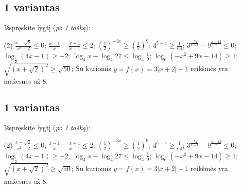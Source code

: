 \documentclass[a4paper]{article}
\begin{document}
\subsection*{1 variantas}

Išspręskite lygtį (\textit{po 1 tašką}):
\begin{tasks}[item-format={\normalfont}, after-item-skip=2mm](2)
      \task $\frac{x-\sqrt{2}}{x^2-2}\leqslant 0$;
      \task $\frac{x-1}{x}-\frac{x+1}{x-1} \leqslant 2$;
      \task $(\frac{1}{2})^{-3x} \geqslant (\frac{1}{2})^9$;
      \task $4^{5-x} \geqslant \frac{1}{64}$;
      \task $3^{\frac{-5x}{x-1}}-9^{\frac{x-12}{2}} \leqslant 0$;
      \task $\log_{\frac{1}{2}}(4x-1) \geq -2$;
      \task $\log_{4}x-\log_{4}27 \leqslant \log_{4}\frac{1}{9}$;
      \task $\log_{6}(-x^2+9x-14) \geq 1$;
      \task $\sqrt{(x+\sqrt{2})^2} \geqslant \sqrt{50}$;
      \task Su kuriomis $y=f(x)=3|x+2|-1$ reikšmės yra mažesnės už 8;
\end{tasks}

\subsection*{1 variantas}

Išspręskite lygtį (\textit{po 1 tašką}):
\begin{tasks}[item-format={\normalfont}, after-item-skip=2mm](2)
      \task $\frac{x-\sqrt{2}}{x^2-2}\leqslant 0$;
      \task $\frac{x-1}{x}-\frac{x+1}{x-1} \leqslant 2$;
      \task $(\frac{1}{2})^{-3x} \geqslant (\frac{1}{2})^9$;
      \task $4^{5-x} \geqslant \frac{1}{64}$;
      \task $3^{\frac{-5x}{x-1}}-9^{\frac{x-12}{2}} \leqslant 0$;
      \task $\log_{\frac{1}{2}}(4x-1) \geq -2$;
      \task $\log_{4}x-\log_{4}27 \leqslant \log_{4}\frac{1}{9}$;
      \task $\log_{6}(-x^2+9x-14) \geq 1$;
      \task $\sqrt{(x+\sqrt{2})^2} \geqslant \sqrt{50}$;
      \task Su kuriomis $y=f(x)=3|x+2|-1$ reikšmės yra mažesnės už 8;
\end{tasks}
\end{document}

